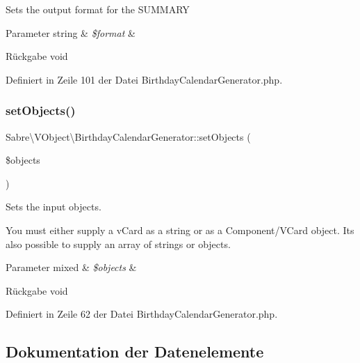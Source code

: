 Sets the output format for the S\+U\+M\+M\+A\+RY


\begin{DoxyParams}[1]{Parameter}
string & {\em \$format} & \\
\hline
\end{DoxyParams}
\begin{DoxyReturn}{Rückgabe}
void 
\end{DoxyReturn}


Definiert in Zeile 101 der Datei Birthday\+Calendar\+Generator.\+php.

\mbox{\label{class_sabre_1_1_v_object_1_1_birthday_calendar_generator_a5e45f6fe7363a9d1842020ddf81e3d85}} 
\subsubsection{\texorpdfstring{set\+Objects()}{setObjects()}}
{\footnotesize\ttfamily Sabre\textbackslash{}\+V\+Object\textbackslash{}\+Birthday\+Calendar\+Generator\+::set\+Objects (\begin{DoxyParamCaption}\item[{}]{\$objects }\end{DoxyParamCaption})}

Sets the input objects.

You must either supply a v\+Card as a string or as a Component/\+V\+Card object. It\textquotesingle{}s also possible to supply an array of strings or objects.


\begin{DoxyParams}[1]{Parameter}
mixed & {\em \$objects} & \\
\hline
\end{DoxyParams}
\begin{DoxyReturn}{Rückgabe}
void 
\end{DoxyReturn}


Definiert in Zeile 62 der Datei Birthday\+Calendar\+Generator.\+php.



\subsection{Dokumentation der Datenelemente}
\mbox{\label{class_sabre_1_1_v_object_1_1_birthday_calendar_generator_ada02ff1d497785eb71d0c14b71fb0275}} 
